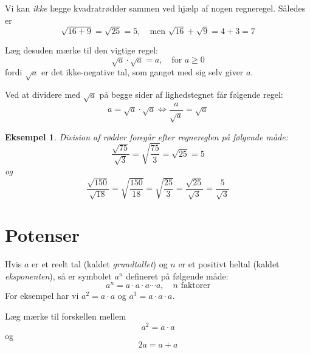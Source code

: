 \documentclass[12pt,oneside,a4paper]{article}
\theoremstyle{plain}
\newtheorem*{eks}{Eksempel}
\begin{document}
Vi kan {\em ikke} lægge kvadratrødder sammen ved hjælp af nogen regneregel.
Således er
$$
\sqrt{16+9} = \sqrt{25} = 5,\quad \mbox{men $\sqrt{16}+\sqrt{9} = 4+3 = 7$}
$$

Læg desuden mærke til den vigtige regel:
$$
\sqrt{a} \cdot \sqrt{a} = a,\quad \mbox{for $a\ge 0$}
$$
fordi $\sqrt{a}$ er det ikke-negative tal, som ganget med sig selv giver $a$.

Ved at dividere med $\sqrt{a}$ på begge sider af lighedstegnet får følgende
regel:
$$
a = \sqrt{a}\cdot\sqrt{a} \Leftrightarrow \frac{a}{\sqrt{a}} = \sqrt{a}
$$

\begin{eks}
    Division af rødder foregår efter regnereglen på følgende måde:
    $$
    \frac{\sqrt{75}}{\sqrt{3}} = \sqrt{\frac{75}{3}} = \sqrt{25} = 5
    $$
    og
    $$
    \frac{\sqrt{150}}{\sqrt{18}} = \sqrt{\frac{150}{18}} = \sqrt{\frac{25}{3}}
    = \frac{\sqrt{25}}{\sqrt{3}} = \frac{5}{\sqrt{3}}
    $$
\end{eks}




\section*{Potenser}
Hvis $a$ er et reelt tal (kaldet {\em grundtallet}) og $n$ er et positivt
heltal (kaldet {\em eksponenten}), så er symbolet $a^n$ defineret på følgende
måde:
$$
a^n = a \cdot a \cdot a \cdots a,\quad \mbox{$n$ faktorer}
$$
For eksempel har vi $a^2 = a \cdot a$ og $a^3 = a \cdot a \cdot a$.

Læg mærke til forskellen mellem
$$
a^2 = a \cdot a
$$
og
$$
2a = a + a
$$
\end{document}
